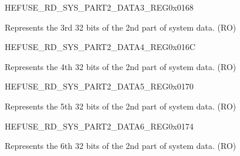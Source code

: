 \begin{register}{H}{EFUSE\_RD\_SYS\_PART2\_DATA3\_REG}{0x0168}\label{regdesc:EFUSERDSYSPART2DATA3REG}
%
\regnewline%
\begin{regdesc}\begin{reglist}
\label{fielddesc:EFUSESYSDATAPART23}\item [EFUSE\_SYS\_DATA\_PART2\_3] Represents the 3rd 32 bits of the 2nd part of system data. (RO)
\end{reglist}\end{regdesc}
\end{register}


\begin{register}{H}{EFUSE\_RD\_SYS\_PART2\_DATA4\_REG}{0x016C}\label{regdesc:EFUSERDSYSPART2DATA4REG}
%
\regnewline%
\begin{regdesc}\begin{reglist}
\label{fielddesc:EFUSESYSDATAPART24}\item [EFUSE\_SYS\_DATA\_PART2\_4] Represents the 4th 32 bits of the 2nd part of system data. (RO)
\end{reglist}\end{regdesc}
\end{register}


\begin{register}{H}{EFUSE\_RD\_SYS\_PART2\_DATA5\_REG}{0x0170}\label{regdesc:EFUSERDSYSPART2DATA5REG}
%
\regnewline%
\begin{regdesc}\begin{reglist}
\label{fielddesc:EFUSESYSDATAPART25}\item [EFUSE\_SYS\_DATA\_PART2\_5] Represents the 5th 32 bits of the 2nd part of system data. (RO)
\end{reglist}\end{regdesc}
\end{register}


\begin{register}{H}{EFUSE\_RD\_SYS\_PART2\_DATA6\_REG}{0x0174}\label{regdesc:EFUSERDSYSPART2DATA6REG}
%
\regnewline%
\begin{regdesc}\begin{reglist}
\label{fielddesc:EFUSESYSDATAPART26}\item [EFUSE\_SYS\_DATA\_PART2\_6] Represents the 6th 32 bits of the 2nd part of system data. (RO)
\end{reglist}\end{regdesc}
\end{register}


